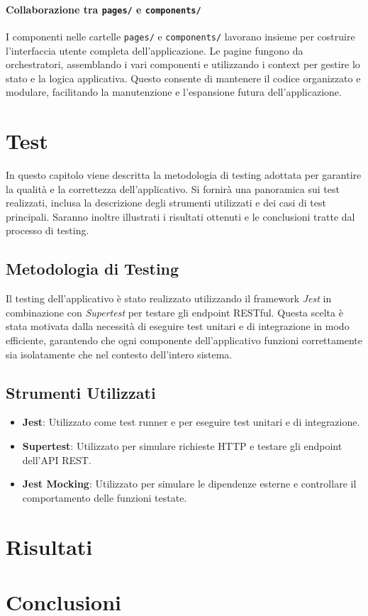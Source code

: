 \documentclass[twoside]{supsistudent}
\begin{document}
\subsubsection{Collaborazione tra \texttt{pages/} e \texttt{components/}}
I componenti nelle cartelle \texttt{pages/} e \texttt{components/} lavorano insieme per costruire l'interfaccia utente completa dell'applicazione. Le pagine fungono da orchestratori, assemblando i vari componenti e utilizzando i context per gestire lo stato e la logica applicativa. Questo consente di mantenere il codice organizzato e modulare, facilitando la manutenzione e l'espansione futura dell'applicazione.


\chapter{Test}

In questo capitolo viene descritta la metodologia di testing adottata per garantire la qualità e la correttezza dell'applicativo. Si fornirà una panoramica sui test realizzati, inclusa la descrizione degli strumenti utilizzati e dei casi di test principali. Saranno inoltre illustrati i risultati ottenuti e le conclusioni tratte dal processo di testing.

\section{Metodologia di Testing}

Il testing dell'applicativo è stato realizzato utilizzando il framework \textit{Jest} in combinazione con \textit{Supertest} per testare gli endpoint RESTful. Questa scelta è stata motivata dalla necessità di eseguire test unitari e di integrazione in modo efficiente, garantendo che ogni componente dell'applicativo funzioni correttamente sia isolatamente che nel contesto dell'intero sistema.

\section{Strumenti Utilizzati}

\begin{itemize}
  \item \textbf{Jest}: Utilizzato come test runner e per eseguire test unitari e di integrazione.
  \item \textbf{Supertest}: Utilizzato per simulare richieste HTTP e testare gli endpoint dell'API REST.
  \item \textbf{Jest Mocking}: Utilizzato per simulare le dipendenze esterne e controllare il comportamento delle funzioni testate.
\end{itemize}






\chapter{Risultati}
\chapter{Conclusioni}


\cite{1705631}


\end{document}
